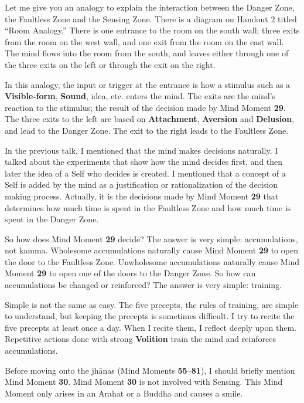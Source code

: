 Let me give you an analogy to explain the interaction between the Danger Zone, the Faultless Zone and the Sensing Zone. There is a diagram on Handout 2 titled “Room Analogy.” There is one entrance to the room on the south wall; three exits from the room on the west wall, and one exit from the room on the east wall. The mind flows into the room from the south, and leaves either through one of the three exits on the left or through the exit on the right.

In this analogy, the input or trigger at the entrance is how a stimulus such as a \textbf{Visible-form}, \textbf{Sound}, idea, etc. enters the mind. The exits are the mind’s reaction to the stimulus; the result of the decision made by Mind Moment \textbf{29}. The three exits to the left are based on \textbf{Attachment}, \textbf{Aversion} and \textbf{Delusion}, and lead to the Danger Zone. The exit to the right leads to the Faultless Zone.

In the previous talk, I mentioned that the mind makes decisions naturally. I talked about the experiments that show how the mind decides first, and then later the idea of a Self who decides is created. I mentioned that a concept of a Self is added by the mind as a justification or rationalization of the decision making process. Actually, it is the decisions made by Mind Moment \textbf{29} that determines how much time is spent in the Faultless Zone and how much time is spent in the Danger Zone.

So how does Mind Moment \textbf{29} decide? The answer is very simple: accumulations, not kamma. Wholesome accumulations naturally cause Mind Moment \textbf{29} to open the door to the Faultless Zone. Unwholesome accumulations naturally cause Mind Moment \textbf{29} to open one of the doors to the Danger Zone. So how can accumulations be changed or reinforced? The answer is very simple: training.

Simple is not the same as easy. The five precepts, the rules of training, are simple to understand, but keeping the precepts is sometimes difficult. I try to recite the five precepts at least once a day. When I recite them, I reflect deeply upon them. Repetitive actions done with strong \textbf{Volition} train the mind and reinforces accumulations.

Before moving onto the jhānas (Mind Moments \textbf{55}--\textbf{81}), I should briefly mention Mind Moment \textbf{30}. Mind Moment \textbf{30} is not involved with Sensing. This Mind Moment only arises in an Arahat or a Buddha and causes a smile. 


